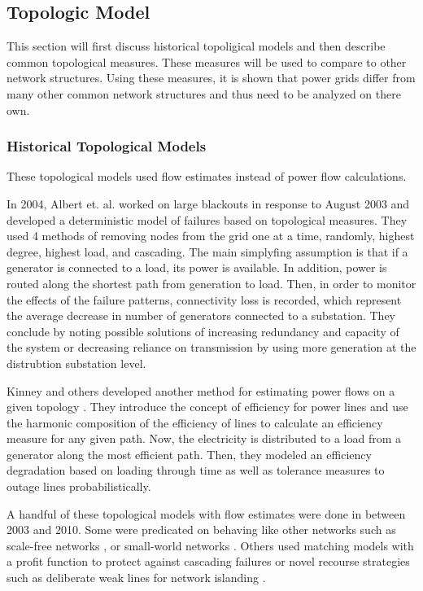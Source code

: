 \subsection{Topologic Model}

This section will first discuss historical topoligical models and then describe common topological measures.  These measures will be used to compare to other network structures.  Using these measures, it is shown that power grids differ from many other common network structures and thus need to be analyzed on there own.  

\subsubsection{Historical Topological Models}

These topological models used flow estimates instead of power flow calculations.

In 2004, Albert et. al. \cite{albert_2004} worked on large blackouts in response to August 2003 and developed a deterministic model of failures based on topological measures.  They used 4 methods of removing nodes from the grid one at a time, randomly, highest degree, highest load, and cascading.  The main simplyfing assumption is that if a generator is connected to a load, its power is available.  In addition, power is routed along the shortest path from generation to load.  Then, in order to monitor the effects of the failure patterns, connectivity loss is recorded, which represent the average decrease in number of generators connected to a substation.  They conclude by noting possible solutions of increasing redundancy and capacity of the system or decreasing reliance on transmission by using more generation at the distrubtion substation level.

Kinney and others developed another method for estimating power flows on a given topology \cite{kinney_2005}.  They introduce the concept of efficiency for power lines and use the harmonic composition of the efficiency of lines to calculate an efficiency measure for any given path.  Now, the electricity is distributed to a load from a generator along the most efficient path.  Then, they modeled an efficiency degradation based on loading through time as well as tolerance measures to outage lines probabilistically.

A handful of these topological models with flow estimates were done in between 2003 and 2010.  Some were predicated on behaving like other networks such as scale-free networks \cite{zhao_2004}, \cite{wang_2009} or small-world networks \cite{ding_2006}.  Others used matching models with a profit function to protect against cascading failures \cite{sun_2008} or novel recourse strategies such as deliberate weak lines for network islanding \cite{duenas-osorio_2009}. 

